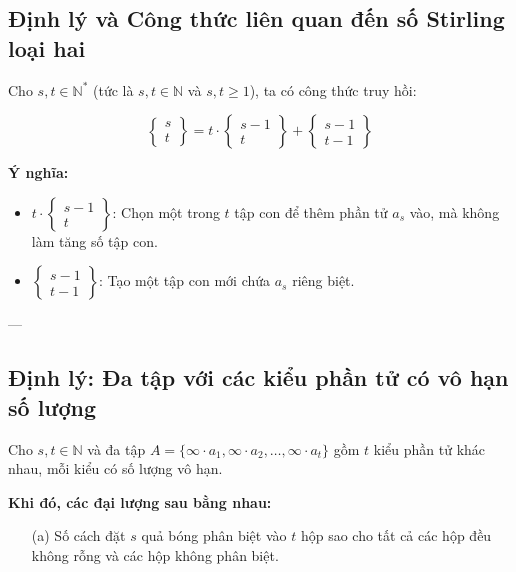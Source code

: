 \documentclass{article}
\begin{document}
	\subsection*{Định lý và Công thức liên quan đến số Stirling loại hai}
	Cho $s, t \in \mathbb{N}^*$ (tức là $s, t \in \mathbb{N}$ và $s, t \geq 1$), ta có công thức truy hồi:
	
	\[
	\left\{ \begin{matrix}
		s \\
		t
	\end{matrix} \right\} = t \cdot \left\{ \begin{matrix}
		s - 1 \\
		t
	\end{matrix} \right\} + \left\{ \begin{matrix}
		s - 1 \\
		t - 1
	\end{matrix} \right\}
	\]
	
	\textbf{Ý nghĩa:}
	\begin{itemize}
		\item $t \cdot \left\{ \begin{matrix} s - 1 \\ t \end{matrix} \right\}$: Chọn một trong $t$ tập con để thêm phần tử $a_s$ vào, mà không làm tăng số tập con.
		\item $\left\{ \begin{matrix} s - 1 \\ t - 1 \end{matrix} \right\}$: Tạo một tập con mới chứa $a_s$ riêng biệt.
	\end{itemize}
	
	---
	
	\subsection*{Định lý: Đa tập với các kiểu phần tử có vô hạn số lượng}
	
	Cho $s, t \in \mathbb{N}$ và đa tập $A = \{\infty \cdot a_1, \infty \cdot a_2, \ldots, \infty \cdot a_t\}$ gồm $t$ kiểu phần tử khác nhau, mỗi kiểu có số lượng vô hạn.
	
	\textbf{Khi đó, các đại lượng sau bằng nhau:}
	
	\begin{enumerate}
		\item[(a)] Số cách đặt $s$ quả bóng phân biệt vào $t$ hộp sao cho tất cả các hộp đều không rỗng và các hộp không phân biệt.
	\end{enumerate}
	
\end{document}
